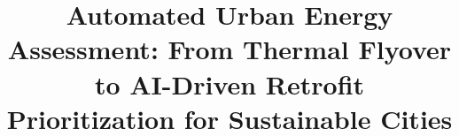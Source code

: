 \documentclass[preprint,12pt]{elsarticle}
\begin{document}
\begin{frontmatter}



\title{Automated Urban Energy Assessment: From Thermal Flyover to AI-Driven Retrofit
  Prioritization for Sustainable Cities}






\end{frontmatter}
\end{document}
